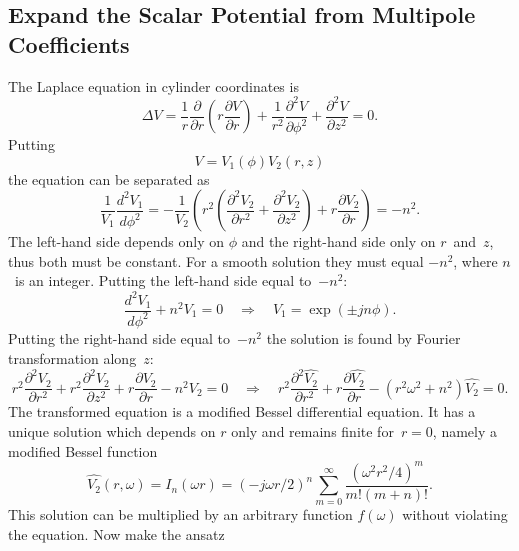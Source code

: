 \documentclass{report}
\begin{document}
\clearpage
\subsection{Expand the Scalar Potential from Multipole Coefficients}
The Laplace equation in cylinder coordinates is
\begin{equation}
  \Delta V = \frac{1}{r}\frac{\partial}{\partial r}
  \left(r \frac{\partial V}{\partial r}\right) + 
  \frac{1}{r^2}\frac{\partial^2 V}{\partial \phi^2} +
  \frac{\partial^2 V}{\partial z^2} = 0.
\end{equation}
Putting
\begin{equation}
  V = V_1(\phi) V_2(r,z)
\end{equation}
the equation can be separated as
\begin{equation}
  \frac{1}{V_1} \frac{d^2 V_1}{d \phi^2} = -
  \frac{1}{V_2} \left(
    r^2 \left(
      \frac{\partial^2 V_2}{\partial r^2} +
      \frac{\partial^2 V_2}{\partial z^2}
    \right)
    + r \frac{\partial V_2}{\partial r}
  \right) = -n^2.
\end{equation}
The left-hand side depends only on $\phi$ and the right-hand side only
on $r$~and~$z$,
thus both must be constant.
For a smooth solution they must equal $-n^2$, where $n$~is an integer.
Putting the left-hand side equal to~$-n^2$:
\begin{equation}
  \frac{d^2V_1}{d\phi^2} + n^2 V_1 = 0 \quad \Rightarrow \quad
  V_1 = \exp(\pm j n \phi).
\end{equation}
Putting the right-hand side equal to~$-n^2$ the solution is found by Fourier
transformation along~$z$: 
\begin{equation}
  r^2 \frac{\partial^2 V_2}{\partial r^2} +
  r^2 \frac{\partial^2 V_2}{\partial z^2} +
  r \frac{\partial V_2}{\partial r} - n^2 V_2 = 0 \quad \Rightarrow \quad
  r^2 \frac{\partial^2 \hat{V_2}}{\partial r^2} +
  r \frac{\partial \hat{V_2}}{\partial r} - (r^2 \omega^2 + n^2) \hat{V_2} = 0.
\end{equation}
The transformed equation is a modified Bessel differential equation.
It has a unique solution which depends on $r$ only and remains finite
for~$r=0$, namely a modified Bessel function
\begin{equation}
  \hat{V_2}(r,\omega) = I_n(\omega r) = (- j \omega r / 2)^n
  \sum_{m=0}^\infty \frac{(\omega^2 r^2 / 4)^m}{m! (m+n)!}.
\end{equation}
This solution can be multiplied by an arbitrary function
$\hat{f}(\omega)$ without violating the equation. 
Now make the ansatz
\end{document}
